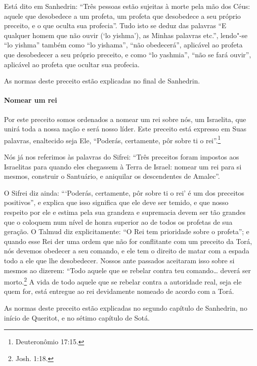 \begin{multicols}{2}
Está dito em Sanhedrin\starr: ``Três pessoas estão sujeitas à morte pela mão
dos Céus: aquele que desobedece a um profeta, um profeta que desobedece
a seu próprio preceito, e o que oculta sua profecia''. Tudo isto se
deduz das palavras ``E qualquer homem que não ouvir (`lo yishma'), as
Minhas palavras etc.'', lendo"-se ``lo yishma'' também como ``lo
yishama'', ``não obedecerá'', aplicável ao profeta que desobedecer a
seu próprio preceito, e como ``lo yashmia'', ``não se fará ouvir'',
aplicável ao profeta que ocultar sua profecia.

As normas deste preceito estão explicadas no final de Sanhedrin\starr.

\paragraph{Nomear um rei}

Por este preceito somos ordenados a nomear um rei sobre nós, um
Israelita, que unirá toda a nossa nação e será nosso líder. Este
preceito está expresso em Suas palavras, enaltecido seja Ele,
``Poderás, certamente, pôr sobre ti o rei''.\footnote{Deuteronômio 17:15.}

Nós já nos referimos às palavras do Sifrei\starr: ``Três preceitos foram
impostos aos Israelitas para quando eles chegassem à Terra de Israel:
nomear um rei para si mesmos, construir o Santuário, e aniquilar os
descendentes de Amalec\starr''.

O Sifrei\starr{} diz ainda: ```Poderás, certamente, pôr sobre ti o rei' é um dos
preceitos positivos'', e explica que isso significa que ele deve ser
temido, e que nosso respeito por ele e estima pela sua grandeza e
supremacia devem ser tão grandes que o coloquem num nível de honra superior ao de todos
os profetas de sua geração. O Talmud\starr{} diz explicitamente: ``O Rei tem
prioridade sobre o profeta''; e quando esse Rei der uma ordem que não for
conflitante com um preceito da Torá\starr, nós devemos obedecer a seu comando, e ele tem
o direito de matar com a espada todo a ele que lhe desobedecer. Nossos
ante passados aceitaram isso sobre si mesmos ao dizerem: ``Todo aquele que se
rebelar contra teu comando\ldots{} deverá ser morto.\footnote{Josh. 1:18.} A vida de
todo aquele que se rebelar contra a autoridade real, seja ele quem for, está entregue ao rei devidamente nomeado de acordo com a Torá\starr.

As normas deste preceito estão explicadas no segundo capítulo de
Sanhedrin\starr, no início de Queritot\starr, e no sétimo capítulo de Sotá\starr.


\end{multicols}

